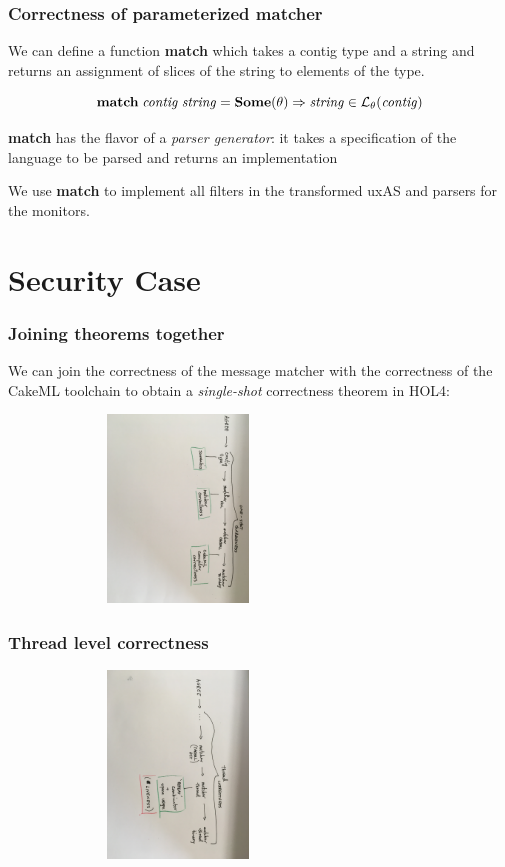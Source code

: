 \documentclass{beamer}
\newcommand{\imp}{\Rightarrow}
\newcommand{\konst}[1]{\ensuremath{\mbox{\bf{#1}}}}
\newcommand{\LangTheta}[1]{\ensuremath{{\mathcal L}_{\theta}({#1})}}
\begin{document}
\begin{frame}[fragile]\frametitle{Correctness of parameterized matcher}

We can define a function \textbf{match} which takes a contig type and
a string and returns an assignment of slices of the string to elements of the type.

\begin{theorem}[Correctness]
  \[
  \konst{match}\; \mathit{contig}\; \mathit{string} = \konst{Some}(\theta) \imp
   \mathit{string} \in \LangTheta{\mathit{contig}}
\]
\end{theorem}

\textbf{match} has the flavor of a \emph{parser generator}: it takes a
specification of the language to be parsed and returns an implementation

We use \textbf{match} to implement all filters in the transformed uxAS
and parsers for the monitors.

\end{frame}

\section {Security Case}

\begin{frame}\frametitle{Joining theorems together}

  We can join the correctness of the message matcher with the
  correctness of the CakeML toolchain to obtain a \emph{single-shot} correctness theorem in HOL4:

  \includegraphics[width=90mm,height=50mm]{one-shot.jpg}

\end{frame}


\begin{frame}\frametitle{Thread level correctness}

  \includegraphics[width=90mm,height=50mm]{thread.jpg}

\end{frame}
\end{document}
